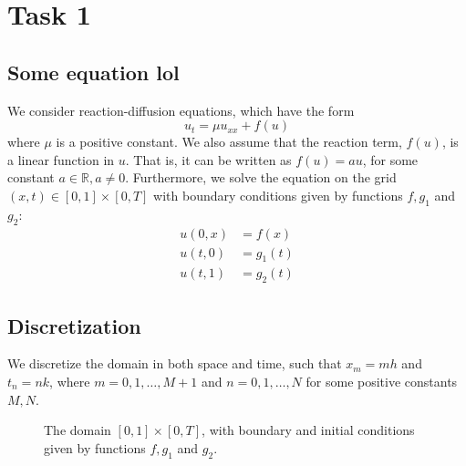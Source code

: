 \section{Task 1}

\subsection{Some equation lol}

We consider reaction-diffusion equations, which have the form
\begin{equation}
    \label{eq:original_eq}
     u_t = \mu u_{xx} + f(u)
\end{equation}
where $\mu$ is a positive constant.
We also assume that the reaction term,
$f(u)$, is a linear function in \( u \).
That is, it can be written as \( f(u) = au \),
for some constant \( a \in \mathbb{R}, a \neq 0 \).
Furthermore, we solve the equation on
the grid \( (x, t) \in [0, 1] \times [0, T] \)
with boundary conditions given by functions
\( f, g_1 \) and \( g_2 \):
\begin{align*}
  u(0, x) &= f(x) \\
  u(t, 0) &= g_1(t) \\
  u(t, 1) &= g_2(t)
\end{align*}

\subsection{Discretization}

We discretize the domain in both space and time,
such that $x_m = mh$ and $t_n = nk$,
where \( m = 0, 1, \dots, M + 1\) and \( n = 0, 1, \dots, N \)
for some positive constants \( M, N \).

\begin{figure}[!h]
  \centering
  \label{fig:disc}
  \caption{The domain \( [0, 1] \times [0, T] \),
    with boundary and initial conditions
    given by functions \( f, g_1 \) and \( g_2 \).
  }
\end{figure}

